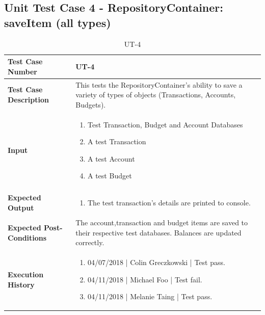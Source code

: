 \documentclass[12pt]{article}
\begin{document}
\subsection{Unit Test Case 4 - RepositoryContainer: saveItem (all types)}
\def\arraystretch{1.5}%
\begin{table}[htbp]
\centering
\caption {UT-4}
\label{UT-4}
\begin{tabularx}{\textwidth}{ | l | X |}
\hline
\textbf{Test Case Number}      &  UT-4                         \\ \hline
\textbf{Test Case Description}    &  This tests the RepositoryContainer's ability to save a variety of types of objects (Transactions, Accounts, Budgets).                \\ \hline
\textbf{Input}         & 	\begin{enumerate}
          \item Test Transaction, Budget and Account Databases
	\item A test Transaction
	\item A test Account
	\item A test Budget
\end{enumerate} \\ \hline

\textbf{Expected Output}     & \begin{enumerate}
	\item The test transaction's details are printed to console.
\end{enumerate} \\ \hline
\textbf{Expected Post-Conditions}           & The account,transaction and budget items are saved to their respective test databases. Balances are updated correctly.                \\ \hline
\textbf{Execution History}   &  \begin{enumerate}
	\item 04/07/2018 | Colin Greczkowski | Test pass.
	\item 04/11/2018 | Michael Foo | Test fail.
	\item 04/11/2018 | Melanie Taing | Test pass.
\end {enumerate} \\ \hline
\end{tabularx}
\end{table}
\clearpage

\end{document}
